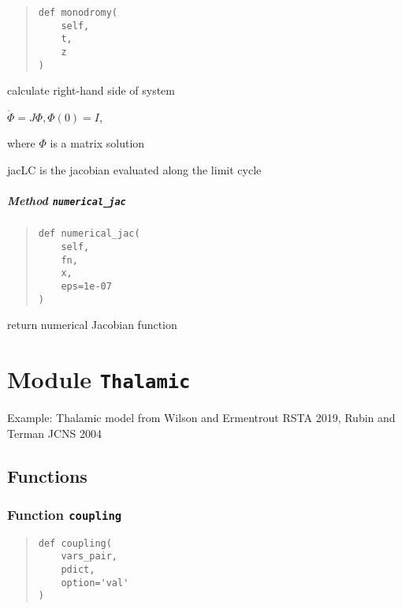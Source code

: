 \documentclass[
  english,
  a4paper,
  oneside]{article}
\begin{document}
\begin{quote}
\begin{verbatim}
def monodromy(
    self,
    t,
    z
)
\end{verbatim}
\end{quote}

calculate right-hand side of system

\(\dot \Phi = J\Phi, \Phi(0)=I\),

where \(\Phi\) is a matrix solution

jacLC is the jacobian evaluated along the limit cycle

\hypertarget{StrongCoupling.StrongCoupling.numerical_jac}{%
\subparagraph{\texorpdfstring{Method
\texttt{numerical\_jac}}{Method numerical\_jac}}\label{StrongCoupling.StrongCoupling.numerical_jac}}

\begin{quote}
\begin{verbatim}
def numerical_jac(
    self,
    fn,
    x,
    eps=1e-07
)
\end{verbatim}
\end{quote}

return numerical Jacobian function

\hypertarget{Thalamic}{%
\section{\texorpdfstring{Module
\texttt{Thalamic}}{Module Thalamic}}\label{Thalamic}}

Example: Thalamic model from Wilson and Ermentrout RSTA 2019, Rubin and
Terman JCNS 2004

\hypertarget{functions-1}{%
\subsection{Functions}\label{functions-1}}

\hypertarget{Thalamic.coupling}{%
\subsubsection{\texorpdfstring{Function
\texttt{coupling}}{Function coupling}}\label{Thalamic.coupling}}

\begin{quote}
\begin{verbatim}
def coupling(
    vars_pair,
    pdict,
    option='val'
)
\end{verbatim}
\end{quote}
\end{document}
